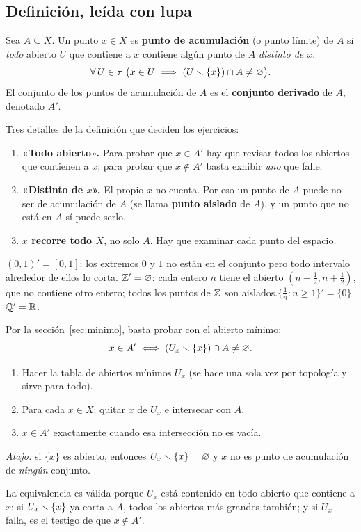\subsection{Definición, leída con lupa}
\begin{definicion}
Sea $A\subseteq X$. Un punto $x\in X$ es \textbf{punto de acumulación} (o punto límite) de $A$ si \emph{todo} abierto
$U$ que contiene a $x$ contiene algún punto de $A$ \emph{distinto de $x$}:
\[\forall\,U\in\tau\ \big(x\in U\ \Longrightarrow\ (U\sm\{x\})\cap A\neq\vac\big).\]
El conjunto de los puntos de acumulación de $A$ es el \textbf{conjunto derivado} de $A$, denotado $A'$.
\end{definicion}
Tres detalles de la definición que deciden los ejercicios:
\begin{enumerate}[leftmargin=1.6em]
\item \textbf{«Todo abierto».} Para probar que $x\in A'$ hay que revisar todos los abiertos que contienen a $x$; para
probar que $x\notin A'$ basta exhibir \emph{uno} que falle.
\item \textbf{«Distinto de $x$».} El propio $x$ no cuenta. Por eso un punto de $A$ puede no ser de acumulación de $A$
(se llama \textbf{punto aislado} de $A$), y un punto que no está en $A$ sí puede serlo.
\item \textbf{$x$ recorre todo $X$}, no solo $A$. Hay que examinar cada punto del espacio.
\end{enumerate}

\begin{ejemplo}
$(0,1)'=[0,1]$: los extremos $0$ y $1$ no están en el conjunto pero todo intervalo alrededor de ellos lo corta.\quad
$\mathbb{Z}'=\varnothing$: cada entero $n$ tiene el abierto $(n-\tfrac12,n+\tfrac12)$, que no contiene otro entero; todos los puntos
de $\mathbb{Z}$ son aislados.\quad $\{\tfrac1n:n\ge1\}'=\{0\}$.\quad $\mathbb{Q}'=\mathbb{R}$.
\end{ejemplo}

\begin{metodo}
Por la sección~\ref{sec:minimo}, basta probar con el abierto mínimo:
\[x\in A'\iff (U_x\smallsetminus\{x\})\cap A\neq\varnothing .\]
\begin{enumerate}[leftmargin=1.6em]
\item Hacer la tabla de abiertos mínimos $U_x$ (se hace una sola vez por topología y sirve para todo).
\item Para cada $x\in X$: quitar $x$ de $U_x$ e intersecar con $A$.
\item $x\in A'$ exactamente cuando esa intersección no es vacía.
\end{enumerate}
\emph{Atajo:} si $\{x\}$ es abierto, entonces $U_x\smallsetminus\{x\}=\varnothing$ y $x$ no es punto de acumulación de \emph{ningún}
conjunto.
\end{metodo}
La equivalencia es válida porque $U_x$ está contenido en todo abierto que contiene a $x$: si $U_x\smallsetminus\{x\}$ ya corta a
$A$, todos los abiertos más grandes también; y si $U_x$ falla, es el testigo de que $x\notin A'$.

